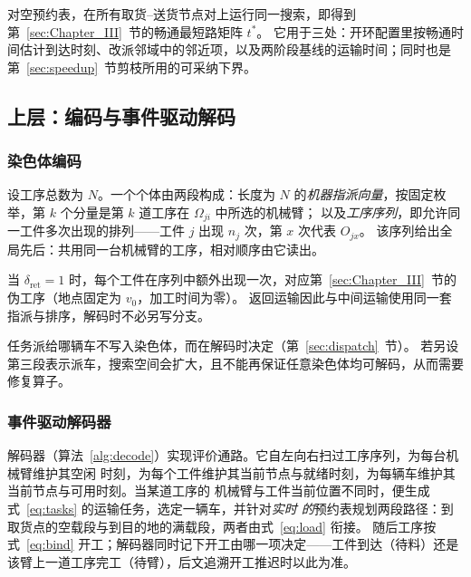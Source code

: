 \documentclass[manuscript,screen,review]{acmart}
\begin{document}
对空预约表，在所有取货--送货节点对上运行同一搜索，即得到第~\ref{sec:Chapter_III}~节的畅通最短路矩阵 $t^{*}$。
它用于三处：开环配置里按畅通时间估计到达时刻、改派邻域中的邻近项，以及两阶段基线的运输时间；同时也是第~\ref{sec:speedup}~节剪枝所用的可采纳下界。


\subsection{上层：编码与事件驱动解码}
\label{sec:upper}

\subsubsection{染色体编码}
设工序总数为 $N$。一个个体由两段构成：长度为 $N$ 的\emph{机器指派向量}，按固定枚举，第 $k$ 个分量是第 $k$ 道工序在 $\Omega_{ji}$ 中所选的机械臂；
以及\emph{工序序列}，即允许同一工件多次出现的排列——工件 $j$ 出现 $n_j$ 次，第 $x$ 次代表 $O_{jx}$。
该序列给出全局先后：共用同一台机械臂的工序，相对顺序由它读出。

当 $\delta_{\mathrm{ret}}=1$ 时，每个工件在序列中额外出现一次，对应第~\ref{sec:Chapter_III}~节的伪工序（地点固定为 $v_0$，加工时间为零）。
返回运输因此与中间运输使用同一套指派与排序，解码时不必另写分支。

任务派给哪辆车不写入染色体，而在解码时决定（第~\ref{sec:dispatch}~节）。
若另设第三段表示派车，搜索空间会扩大，且不能再保证任意染色体均可解码，从而需要修复算子。


\subsubsection{事件驱动解码器}
解码器（算法~\ref{alg:decode}）实现评价通路。它自左向右扫过工序序列，为每台机械臂维护其空闲
时刻，为每个工件维护其当前节点与就绪时刻，为每辆车维护其当前节点与可用时刻。当某道工序的
机械臂与工件当前位置不同时，便生成式~\eqref{eq:tasks} 的运输任务，选定一辆车，并针对\emph{实时
的}预约表规划两段路径：到取货点的空载段与到目的地的满载段，两者由式~\eqref{eq:load} 衔接。
随后工序按式~\eqref{eq:bind} 开工；解码器同时记下开工由哪一项决定——工件到达（待料）还是该臂上一道工序完工（待臂），后文追溯开工推迟时以此为准。
\end{document}
